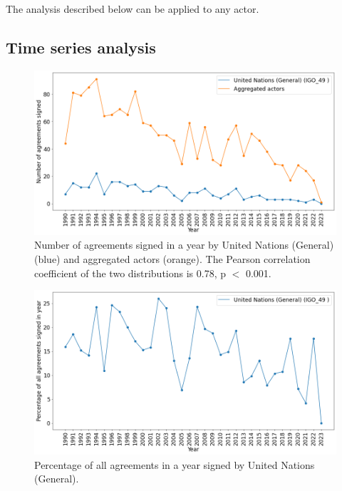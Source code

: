 \documentclass{article}
\begin{document}
The analysis described below can be applied to any actor.
 
\subsection{Time series analysis}

\begin{figure}[H]
\begin{center}
\includegraphics[scale=0.36]{./assets/figure_5.png}
\caption{Number of agreements signed in a year by United Nations (General) (blue) and aggregated actors (orange). The Pearson correlation coefficient of the two distributions is 0.78, p $<$ 0.001.}
\end{center}
\end{figure}

\begin{figure}[H]
\begin{center}
\includegraphics[scale=0.36]{./assets/figure_6.png}
\caption{Percentage of all agreements in a year signed by United Nations (General).}
\end{center}
\end{figure}
\end{document}
